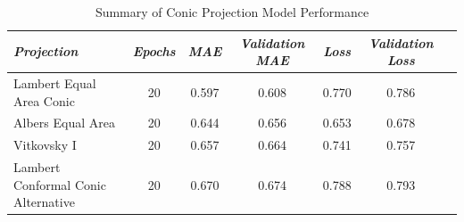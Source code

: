 \begin{table}[ht]

    \caption{Summary of Conic Projection Model Performance}
    \label{conic_results_table}
    \renewcommand{\arraystretch}{1.2} %
    \begin{tabular}{|l|c|c|c|c|c|c|}
        \hline
        \rowcolor[gray]{0.9}
        \textbf{\emph{Projection}}          & \textbf{\emph{Epochs}} & \textbf{\emph{MAE}} & \textbf{\emph{Validation MAE}} & \textbf{\emph{Loss}} & \textbf{\emph{Validation Loss}} \\ \hline
        Lambert Equal Area Conic            & 20                     & 0.597               & 0.608                          & 0.770                & 0.786                           \\ \hline
        Albers Equal Area                   & 20                     & 0.644               & 0.656                          & 0.653                & 0.678                           \\ \hline
        Vitkovsky I                         & 20                     & 0.657               & 0.664                          & 0.741                & 0.757                           \\ \hline
        Lambert Conformal Conic Alternative & 20                     & 0.670               & 0.674                          & 0.788                & 0.793                           \\ \hline
    \end{tabular}
\end{table}